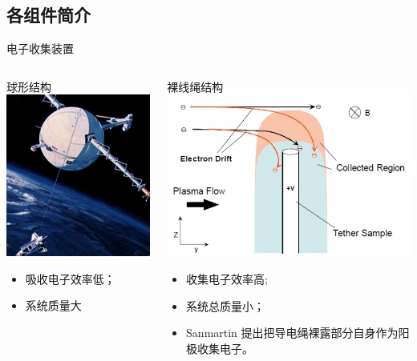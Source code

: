 \documentclass[sectioncirclenumberstyle]{le2iutbmbeamer}
\begin{document}
\subsection{各组件简介}
\begin{frame}[c]{电子收集装置}
\begin{columns}
\begin{column}{.5\linewidth}
\begin{block}{球形结构}
\centering
\includegraphics[width=0.7\linewidth]{figures/spherestruc}
\begin{itemize}
\item 吸收电子效率低；
\item 系统质量大
\end{itemize}
\end{block}
\end{column}%
\hfil
\begin{column}{.5\linewidth}
\begin{block}{裸线绳结构}
\centering
\includegraphics[width=0.8\linewidth]{figures/bareoml}
\begin{itemize}
\item 收集电子效率高;
\item  系统总质量小；
\item Sanmartin 提出把导电绳裸露部分自身作为阳极收集电子。

\end{itemize}
\end{block}
\end{column}
\end{columns}
\end{frame}
\end{document}
